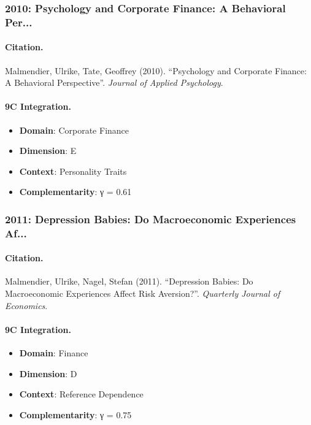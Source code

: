 \subsubsection{2010: Psychology and Corporate Finance: A Behavioral Per...}

\paragraph{Citation.}
Malmendier, Ulrike, Tate, Geoffrey (2010). ``Psychology and Corporate Finance: A Behavioral Perspective''. \textit{Journal of Applied Psychology}.

\paragraph{9C Integration.}
\begin{itemize}[nosep]
  \item \textbf{Domain}: Corporate Finance
  \item \textbf{Dimension}: E
  \item \textbf{Context}: Personality Traits
  \item \textbf{Complementarity}: γ = 0.61
\end{itemize}


\subsubsection{2011: Depression Babies: Do Macroeconomic Experiences Af...}

\paragraph{Citation.}
Malmendier, Ulrike, Nagel, Stefan (2011). ``Depression Babies: Do Macroeconomic Experiences Affect Risk Aversion?''. \textit{Quarterly Journal of Economics}.

\paragraph{9C Integration.}
\begin{itemize}[nosep]
  \item \textbf{Domain}: Finance
  \item \textbf{Dimension}: D
  \item \textbf{Context}: Reference Dependence
  \item \textbf{Complementarity}: γ = 0.75
\end{itemize}


